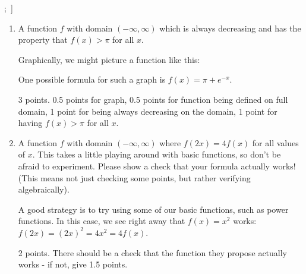 \documentclass[10pt]{article}
\DeclareRobustCommand{\numbox}[1]{\tikz[overlay, baseline=-10pt, trapezium stretches=true] \node[trapezium, trapezium left angle=45, trapezium right angle=90, shape border rotate=90, anchor=north, text depth=1cm, inner ysep=8pt, fill=color1, text=white, font=\Large]{#1}; \,}
\begin{document}
\begin{enumerate}[leftmargin=*, label=\numbox{\arabic*}]
\begin{enumerate}
        \begin{grading}
        4 points. 1 point for the function always decreasing on $(2, \infty)$, 1 point for the function going through the point, 1 point for correctly showing work/how they transform the base function, 0.5 points for the graph, 0.5 points for being defined on the full domain.
        \end{grading}
        \item
        \begin{problem}
            A function $f$ with domain $(-\infty, \infty)$ which is always
            decreasing and has the property that $f(x) > \pi$ for all $x$.
        \end{problem}

        \begin{solution}
            Graphically, we might picture a function like this:
            \begin{center}
            \end{center}
            One possible formula for such a graph is $\boxed{f(x) = \pi + e^{-x}}$.
        \end{solution}
        \begin{grading}
        3 points. 0.5 points for graph, 0.5 points for function being defined on full domain, 1 point for being always decreasing on the domain, 1 point for having $f(x) > \pi$ for all $x$. 
        \end{grading}
        \item
        \begin{problem}
            A function $f$ with domain $(-\infty, \infty)$ where $f(2x) = 4 f(x)$ for all values of $x$. This takes a little playing around with basic functions, so don't be afraid to experiment. Please show a check that your formula actually works! (This means not just checking some points, but rather verifying algebraically).
        \end{problem}

        \begin{solution}
            A good strategy is to try using some of our basic functions, such as power functions. In this case, we see right away that $\boxed{f(x) = x^2}$ works: $f(2x) = (2x)^2 = 4 x^2 = 4 f(x)$. 
        \end{solution}
        \begin{grading}
        2 points. There should be a check that the function they propose actually works - if not, give 1.5 points.
        \end{grading}
    \end{enumerate}


\end{enumerate}
\end{document}
